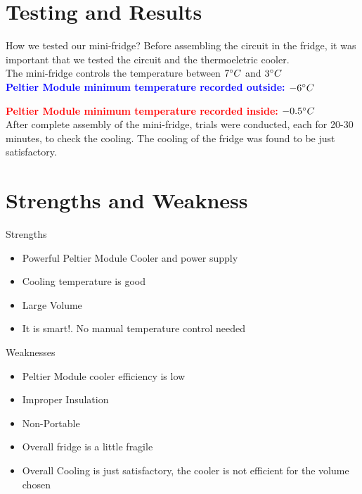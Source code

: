 \documentclass[10pt]{beamer}
\begin{document}
{\section{Testing and Results}
{
	\begin{frame}{How we tested our mini-fridge?}
		Before assembling the circuit in the fridge, it was important that we tested the circuit and the thermoeletric cooler.\\
		 The mini-fridge controls the temperature between $7\degree{C}$ and $3\degree{C}$\\
		\vspace{5mm}
		\textcolor{blue}{\bfseries{Peltier Module minimum temperature recorded outside: $-6\degree{C}$}}
		
		\vspace{5mm}
		\textcolor{red}{\bfseries{Peltier Module minimum temperature recorded inside: $-0.5\degree{C}$}}\\
		
		\vspace{5mm}
		After complete assembly of the mini-fridge, trials were conducted, each for 20-30 minutes, to check the cooling. The cooling of the fridge was found to be just satisfactory.
	\end{frame}
}

\section{Strengths and Weakness}
{
	\begin{frame}{Strengths}
		\begin{itemize}[<+- | alert@+>]
			\item Powerful Peltier Module Cooler and power supply
			\item Cooling temperature is good
			\item Large Volume
			\item It is smart!. No manual temperature control needed
		\end{itemize}
	\end{frame}
}
{
	\begin{frame}{Weaknesses}
		\begin{itemize}[<+- | alert@+>]
			\item Peltier Module cooler efficiency is low
			\item Improper Insulation
			\item Non-Portable
			\item Overall fridge is a little fragile
			\item Overall Cooling is just satisfactory, the cooler is not efficient for the volume chosen
		\end{itemize}
	\end{frame}
}
}
\end{document}
